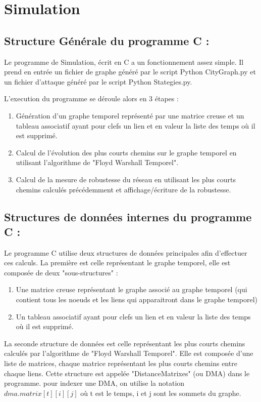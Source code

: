 \section{Simulation}\label{sec:simulation}

\subsection{Structure Générale du programme C :}

Le programme de Simulation, écrit en C a un fonctionnement assez simple. 
Il prend en entrée un fichier de graphe généré par le script Python CityGraph.py et un 
fichier d'attaque généré par le script Python Stategies.py. 

L'execution du programme se déroule alors en 3 étapes :
\begin{enumerate}
    \item Génération d'un graphe temporel représenté par une matrice creuse et un tableau associatif ayant pour clefs un lien et en valeur la liste des temps où il est supprimé. 
    \item Calcul de l'évolution des plus courts chemins sur le graphe temporel en utilisant l'algorithme de "Floyd Warshall Temporel".
    \item Calcul de la mesure de robustesse du réseau en utilisant les plus courts chemins calculés précédemment et affichage/écriture de la robustesse.
\end{enumerate}

\subsection{Structures de données internes du programme C :}
Le programme C utilise deux structures de données principales afin d'effectuer ces calculs. 
La première est celle représentant le graphe temporel, elle est composée de deux "sous-structures" :
\begin{enumerate}
    \item Une matrice creuse représentant le graphe associé au graphe temporel (qui contient tous les noeuds et les liens qui apparaitront dans le graphe temporel)
    \item Un tableau associatif ayant pour clefs un lien et en valeur la liste des temps où il est supprimé.
\end{enumerate}
La seconde structure de données est celle représentant les plus courts chemins calculés par l'algorithme de "Floyd Warshall Temporel".
Elle est composée d'une liste de matrices, chaque matrice représentant les plus courts chemins entre chaque liens.
Cette structure est appelée "DistanceMatrixes" (ou DMA) dans le programme.
pour indexer une DMA, on utilise la notation $dma.matrix[t][i][j]$ où t est le temps, i et j sont les sommets du graphe.


